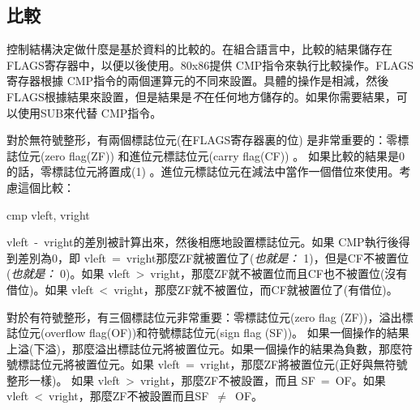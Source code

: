 \subsection{比較  }

控制結構決定做什麼是基於資料的比較的。在組合語言中，比較的結果儲存在FLAGS寄存器中，以便以後使用。80x86提供{\code
CMP}指令來執行比較操作。FLAGS寄存器根據{\code
CMP}指令的兩個運算元的不同來設置。具體的操作是相減，然後FLAGS根據結果來設置，但是結果是\emph{不}在任何地方儲存的。如果你需要結果，可以使用SUB來代替{\code
CMP}指令。

對於無符號整形，有兩個標誌位元(在FLAGS寄存器裏的位)
是非常重要的：零標誌位元(zero flag(ZF))
和進位元標誌位元(carry flag(CF))
。 如果比較的結果是0的話，零標誌位元將置成(1)
。進位元標誌位元在減法中當作一個借位來使用。考慮這個比較：
\begin{AsmCodeListing}[frame=none, numbers=none]
      cmp    vleft, vright
\end{AsmCodeListing}
{\code
vleft~-~vright}的差別被計算出來，然後相應地設置標誌位元。如果{\code
CMP}執行後得到差別為0，即{\code
vleft~=~vright}那麼ZF就被置位了(\emph{也就是：} 1)，但是CF不被置位
(\emph{也就是：} 0)。如果{\code
vleft~>~vright}，那麼ZF就不被置位而且CF也不被置位(沒有借位)。如果
{\code vleft~<~vright}，那麼ZF就不被置位，而CF就被置位了(有借位)。

對於有符號整形，有三個標誌位元非常重要：零標誌位元(zero flag
 (ZF))，溢出標誌位元(overflow
flag(OF))和符號標誌位元(sign
flag (SF))。 如果一個操作的結果上溢(下溢)，那麼溢出標誌位元將被置位元。如果一個操作的結果為負數，那麼符號標誌位元將被置位元。如果{\code
vleft~=~vright}，那麼ZF將被置位元(正好與無符號整形一樣)。 如果{\code
vleft~>~vright}，那麼ZF不被設置，而且 SF~=~OF。如果{\code
vleft~<~vright}，那麼ZF不被設置而且SF~$\neq$~OF。

